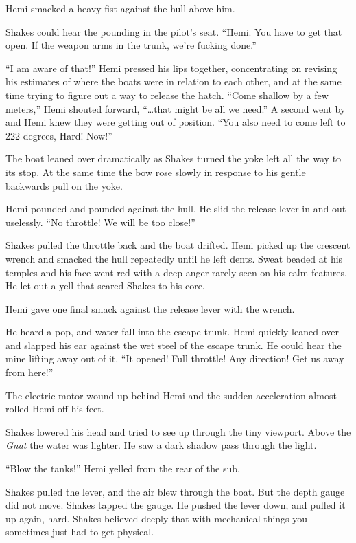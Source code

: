 \documentclass[
]{scrbook}
\begin{document}
Hemi smacked a heavy fist against the hull above him.

Shakes could hear the pounding in the pilot's seat. ``Hemi. You have to
get that open. If the weapon arms in the trunk, we're fucking done.''

``I am aware of that!'' Hemi pressed his lips together, concentrating on
revising his estimates of where the boats were in relation to each
other, and at the same time trying to figure out a way to release the
hatch. ``Come shallow by a few meters,'' Hemi shouted forward,
``\ldots that might be all we need.'' A second went by and Hemi knew
they were getting out of position. ``You also need to come left to 222
degrees, Hard! Now!''

The boat leaned over dramatically as Shakes turned the yoke left all the
way to its stop. At the same time the bow rose slowly in response to his
gentle backwards pull on the yoke.

Hemi pounded and pounded against the hull. He slid the release lever in
and out uselessly. ``No throttle! We will be too close!''

Shakes pulled the throttle back and the boat drifted. Hemi picked up the
crescent wrench and smacked the hull repeatedly until he left dents.
Sweat beaded at his temples and his face went red with a deep anger
rarely seen on his calm features. He let out a yell that scared Shakes
to his core.

Hemi gave one final smack against the release lever with the wrench.

He heard a pop, and water fall into the escape trunk. Hemi quickly
leaned over and slapped his ear against the wet steel of the escape
trunk. He could hear the mine lifting away out of it. ``It opened! Full
throttle! Any direction! Get us away from here!''

The electric motor wound up behind Hemi and the sudden acceleration
almost rolled Hemi off his feet.

Shakes lowered his head and tried to see up through the tiny viewport.
Above the \emph{Gnat} the water was lighter. He saw a dark shadow pass
through the light.

``Blow the tanks!'' Hemi yelled from the rear of the sub.

Shakes pulled the lever, and the air blew through the boat. But the
depth gauge did not move. Shakes tapped the gauge. He pushed the lever
down, and pulled it up again, hard. Shakes believed deeply that with
mechanical things you sometimes just had to get physical.
\end{document}
